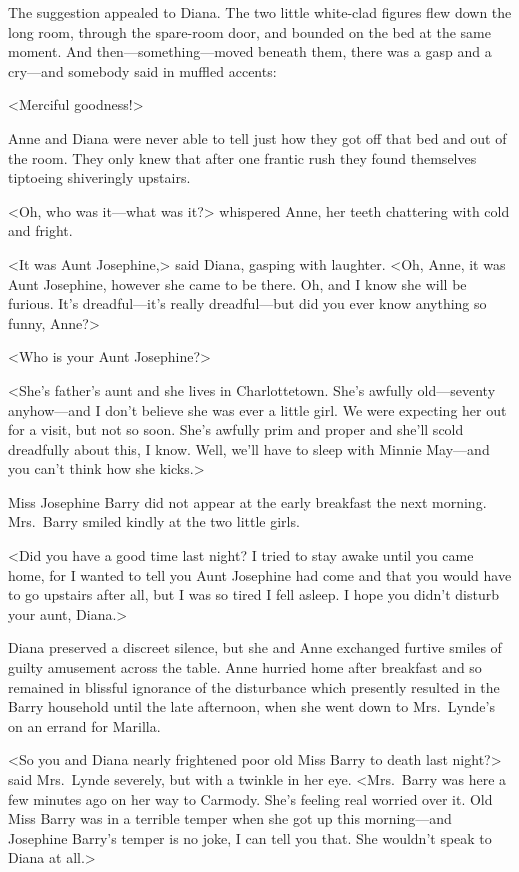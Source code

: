 The suggestion appealed to Diana. The two little white-clad figures flew down the long room, through the spare-room door, and bounded on the bed at the same moment. And then—something—moved beneath them, there was a gasp and a cry—and somebody said in muffled accents:

<Merciful goodness!>

Anne and Diana were never able to tell just how they got off that bed and out of the room. They only knew that after one frantic rush they found themselves tiptoeing shiveringly upstairs.

<Oh, who was it—what was it?> whispered Anne, her teeth chattering with cold and fright.

<It was Aunt Josephine,> said Diana, gasping with laughter. <Oh, Anne, it was Aunt Josephine, however she came to be there. Oh, and I know she will be furious. It's dreadful—it's really dreadful—but did you ever know anything so funny, Anne?>

<Who is your Aunt Josephine?>

<She's father's aunt and she lives in Charlottetown. She's awfully old—seventy anyhow—and I don't believe she was ever a little girl. We were expecting her out for a visit, but not so soon. She's awfully prim and proper and she'll scold dreadfully about this, I know. Well, we'll have to sleep with Minnie May—and you can't think how she kicks.>

Miss Josephine Barry did not appear at the early breakfast the next morning. Mrs.~Barry smiled kindly at the two little girls.

<Did you have a good time last night? I tried to stay awake until you came home, for I wanted to tell you Aunt Josephine had come and that you would have to go upstairs after all, but I was so tired I fell asleep. I hope you didn't disturb your aunt, Diana.>

Diana preserved a discreet silence, but she and Anne exchanged furtive smiles of guilty amusement across the table. Anne hurried home after breakfast and so remained in blissful ignorance of the disturbance which presently resulted in the Barry household until the late afternoon, when she went down to Mrs.~Lynde's on an errand for Marilla.

<So you and Diana nearly frightened poor old Miss Barry to death last night?> said Mrs.~Lynde severely, but with a twinkle in her eye. <Mrs.~Barry was here a few minutes ago on her way to Carmody. She's feeling real worried over it. Old Miss Barry was in a terrible temper when she got up this morning—and Josephine Barry's temper is no joke, I can tell you that. She wouldn't speak to Diana at all.>

